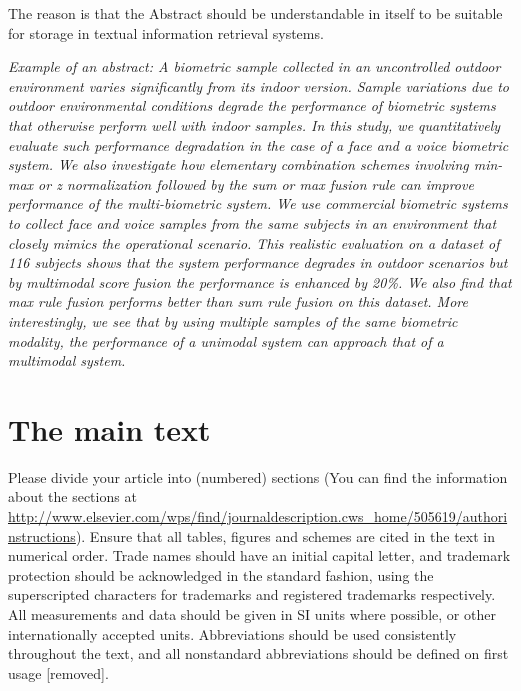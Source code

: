 \documentclass[times,twocolumn,final]{elsarticle}
\begin{document}
The reason is that the Abstract should be understandable in itself to
be suitable for storage in textual information retrieval systems.

\textit{Example of an abstract: A biometric sample collected in an
uncontrolled outdoor environment varies significantly from its
indoor version. Sample variations due to outdoor environmental
conditions degrade the performance of biometric systems that
otherwise perform well with indoor samples. In this study, we
quantitatively evaluate such performance degradation in the case
of a face and a voice biometric system. We also investigate how
elementary combination schemes involving min-max or z
normalization followed by the sum or max fusion rule can
improve performance of the multi-biometric system. We use
commercial biometric systems to collect face and voice samples
from the same subjects in an environment that closely mimics the
operational scenario. This realistic evaluation on a dataset of
116 subjects shows that the system performance degrades in
outdoor scenarios but by multimodal score fusion the
performance is enhanced by 20\%. We also find that max rule
fusion performs better than sum rule fusion on this dataset. More
interestingly, we see that by using multiple samples of the same
biometric modality, the performance of a unimodal system can
approach that of a multimodal system.}

\section{The main text}

Please divide your article into (numbered) sections (You can find the
information about the sections at
\url{http://www.elsevier.com/wps/find/journaldescription.cws_home/505619/authorinstructions}).
Ensure that all tables, figures and schemes are cited in the text in
numerical order. Trade names should have an initial capital letter, and
trademark protection should be acknowledged in the standard fashion,
using the superscripted characters for trademarks and registered
trademarks respectively. All measurements and data should be given in
SI units where possible, or other internationally accepted units.
Abbreviations should be used consistently throughout the text, and all
nonstandard abbreviations should be defined on first usage
[removed].
\end{document}
